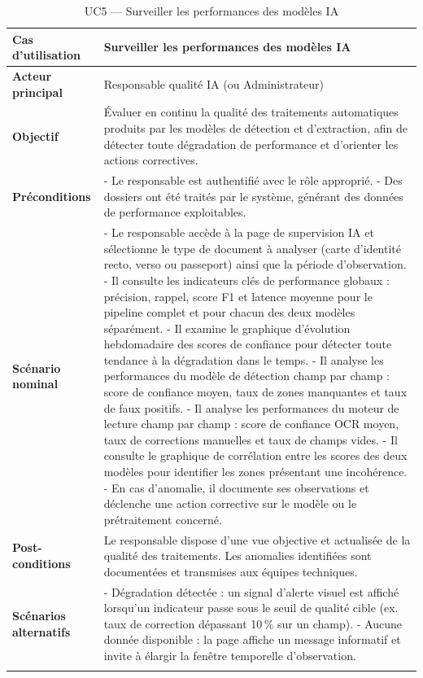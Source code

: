 \begin{longtable}{|>{\bfseries}p{3.8cm}|p{10.2cm}|}
  \hline
  Cas d'utilisation    & Surveiller les performances des modèles IA \\
  \hline
  Acteur principal     & Responsable qualité IA (ou Administrateur) \\
  \hline
  Objectif             & Évaluer en continu la qualité des traitements automatiques produits par les modèles de détection et d'extraction, afin de détecter toute dégradation de performance et d'orienter les actions correctives. \\
  \hline
  Préconditions        &
    - Le responsable est authentifié avec le rôle approprié. \newline
    - Des dossiers ont été traités par le système, générant des données de performance exploitables. \\
  \hline
  Scénario nominal     &
    - Le responsable accède à la page de supervision IA et sélectionne le type de document à analyser (carte d'identité recto, verso ou passeport) ainsi que la période d'observation. \newline
    - Il consulte les indicateurs clés de performance globaux : précision, rappel, score F1 et latence moyenne pour le pipeline complet et pour chacun des deux modèles séparément. \newline
    - Il examine le graphique d'évolution hebdomadaire des scores de confiance pour détecter toute tendance à la dégradation dans le temps. \newline
    - Il analyse les performances du modèle de détection champ par champ : score de confiance moyen, taux de zones manquantes et taux de faux positifs. \newline
    - Il analyse les performances du moteur de lecture champ par champ : score de confiance OCR moyen, taux de corrections manuelles et taux de champs vides. \newline
    - Il consulte le graphique de corrélation entre les scores des deux modèles pour identifier les zones présentant une incohérence. \newline
    - En cas d'anomalie, il documente ses observations et déclenche une action corrective sur le modèle ou le prétraitement concerné. \\
  \hline
  Post-conditions      & Le responsable dispose d'une vue objective et actualisée de la qualité des traitements. Les anomalies identifiées sont documentées et transmises aux équipes techniques. \\
  \hline
  Scénarios alternatifs &
    - Dégradation détectée : un signal d'alerte visuel est affiché lorsqu'un indicateur passe sous le seuil de qualité cible (ex. taux de correction dépassant 10\,\% sur un champ). \newline
    - Aucune donnée disponible : la page affiche un message informatif et invite à élargir la fenêtre temporelle d'observation. \\
  \hline
  \caption{UC5 --- Surveiller les performances des modèles IA}
  \label{tab:uc5}
\end{longtable}
